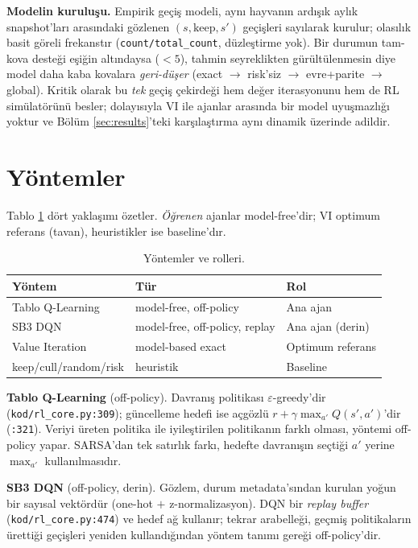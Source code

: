 \documentclass[conference]{IEEEtran}
\begin{document}
\textbf{Modelin kuruluşu.} Empirik geçiş modeli, aynı hayvanın ardışık aylık
snapshot'ları arasındaki gözlenen $(s,\text{keep},s')$ geçişleri sayılarak kurulur;
olasılık basit göreli frekanstır (\texttt{count/total\_count}, düzleştirme yok). Bir
durumun tam-kova desteği eşiğin altındaysa ($<\!5$), tahmin seyreklikten gürültülenmesin
diye model daha kaba kovalara \emph{geri-düşer}
(exact $\rightarrow$ risk'siz $\rightarrow$ evre+parite $\rightarrow$ global). Kritik
olarak bu \emph{tek} geçiş çekirdeği hem değer iterasyonunu hem de RL simülatörünü besler;
dolayısıyla VI ile ajanlar arasında bir model uyuşmazlığı yoktur ve Bölüm
\ref{sec:results}'teki karşılaştırma aynı dinamik üzerinde adildir.

\section{Yöntemler}
Tablo \ref{tab:methods} dört yaklaşımı özetler. \emph{Öğrenen} ajanlar model-free'dir;
VI optimum referans (tavan), heuristikler ise baseline'dır.

\begin{table}[t]
\caption{Yöntemler ve rolleri.}
\label{tab:methods}
\centering\footnotesize
\begin{tabular}{@{}p{2.5cm} p{2.6cm} p{2.4cm}@{}}
\toprule
Yöntem & Tür & Rol \\
\midrule
Tablo Q-Learning & model-free, off-policy & Ana ajan \\
SB3 DQN & model-free, off-policy, replay & Ana ajan (derin) \\
Value Iteration & model-based exact & Optimum referans \\
keep/cull/random/risk & heuristik & Baseline \\
\bottomrule
\end{tabular}
\end{table}

\textbf{Tablo Q-Learning} (off-policy). Davranış politikası $\varepsilon$-greedy'dir
(\texttt{kod/rl\_core.py:309}); güncelleme hedefi ise açgözlü
$r+\gamma\max_{a'}Q(s',a')$'dir (\texttt{:321}). Veriyi üreten politika ile
iyileştirilen politikanın farklı olması, yöntemi off-policy yapar. SARSA'dan tek satırlık
farkı, hedefte davranışın seçtiği $a'$ yerine $\max_{a'}$ kullanılmasıdır.

\textbf{SB3 DQN} (off-policy, derin). Gözlem, durum metadata'sından kurulan yoğun bir
sayısal vektördür (one-hot $+$ z-normalizasyon). DQN bir \emph{replay buffer}
(\texttt{kod/rl\_core.py:474}) ve hedef ağ kullanır; tekrar arabelleği, geçmiş
politikaların ürettiği geçişleri yeniden kullandığından yöntem tanımı gereği off-policy'dir.
\end{document}
